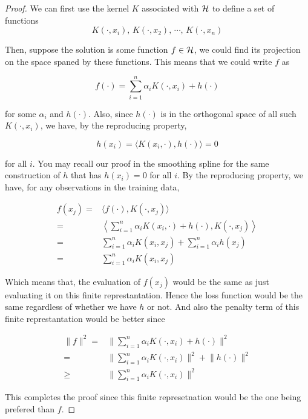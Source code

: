 \documentclass[
]{book}
\theoremstyle{definition}
\theoremstyle{definition}
\theoremstyle{definition}
\theoremstyle{definition}
\theoremstyle{remark}
\begin{document}
\begin{proof}
We can first use the kernel \(K\) associated with \(\cal H\) to define a set of functions
\[K(\cdot, x_i), \, K(\cdot, x_2), \, \cdots, \, K(\cdot, x_n)\]

Then, suppose the solution is some function \(f \in {\cal H}\), we could find its projection on the space spaned by these functions. This means that we could write \(f\) as

\[f(\cdot) = \sum_{i=1}^n \alpha_i K(\cdot, x_i) + h(\cdot)\]

for some \(\alpha_i\) and \(h(\cdot)\). Also, since \(h(\cdot)\) is in the orthogonal space of all such \(K(\cdot, x_i)\), we have, by the reproducing property,

\[ h(x_i) = \langle K(x_i, \cdot), h(\cdot) \rangle = 0\]

for all \(i\). You may recall our proof in the smoothing spline for the same construction of \(h\) that has \(h(x_i) = 0\) for all \(i\). By the reproducing property, we have, for any observations in the training data,

\begin{align}
f(x_j) =& \langle f(\cdot), K(\cdot, x_j) \rangle \nonumber \\
=& \left\langle \sum_{i=1}^n \alpha_i K(x_i, \cdot) + h(\cdot), K(\cdot, x_j) \right\rangle \nonumber \\
=& \sum_{i=1}^n \alpha_i K(x_i, x_j) + \sum_{i=1}^n \alpha_i h(x_j) \nonumber \\
=& \sum_{i=1}^n \alpha_i K(x_i, x_j)
\end{align}

Which means that, the evaluation of \(f(x_j)\) would be the same as just evaluating it on this finite represtantation. Hence the loss function would be the same regardless of whether we have \(h\) or not. And also the penalty term of this finite represtantation would be better since

\begin{align}
\lVert f \rVert^2 =& \lVert \sum_{i=1}^n \alpha_i K(\cdot, x_i) + h(\cdot) \rVert^2 \nonumber \\
=& \lVert \sum_{i=1}^n \alpha_i K(\cdot, x_i) \rVert^2 + \lVert h(\cdot) \rVert^2 \nonumber \\
\geq& \lVert \sum_{i=1}^n \alpha_i K(\cdot, x_i) \rVert^2
\end{align}

This completes the proof since this finite represetnation would be the one being prefered than \(f\).
\end{proof}
\end{document}
